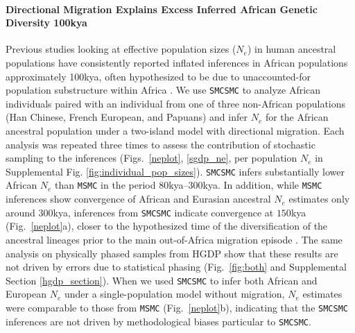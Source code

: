 \paragraph{Directional Migration Explains Excess Inferred African Genetic Diversity 100kya} Previous studies looking at effective population sizes ($N_e$) in human ancestral populations have consistently reported inflated inferences in African populations approximately 100kya, often hypothesized to be due to unaccounted-for population substructure within Africa \cite{Li2011,Schiffels2014}. We use {\tt SMCSMC} to analyze African individuals paired with an individual from one of three non-African populations (Han Chinese, French European, and Papuans) and infer $N_e$ for the African ancestral population under a two-island model with directional migration.  Each analysis was repeated three times to assess the contribution of stochastic sampling to the inferences (Figs.\ \ref{neplot}, \ref{sgdp_ne}, per population $N_e$ in Supplemental Fig. \ref{fig:individual_pop_sizes}). {\tt SMCSMC} infers substantially lower African $N_e$ than {\tt MSMC} in the period $80$kya--$300$kya.  In addition, while {\tt MSMC} inferences show convergence of African and Eurasian ancestral $N_e$ estimates only around $300$kya, inferences from {\tt SMCSMC} indicate convergence at $150$kya (Fig.\ \ref{neplot}a), closer to the hypothesized time of the diversification of the ancestral lineages prior to the main out-of-Africa migration episode \cite{Timmermann2016, Malaspinas2016}. The same analysis on physically phased samples from HGDP show that these results are not driven by errors due to statistical phasing (Fig.\ \ref{fig:both} and Supplemental Section \ref{hgdp_section}). When we used {\tt SMCSMC} to infer both African and European $N_e$ under a single-population model without migration, $N_e$ estimates were comparable to those from {\tt MSMC} (Fig.\ \ref{neplot}b), indicating that the {\tt SMCSMC} inferences are not driven by methodological biases particular to {\tt SMCSMC}.


